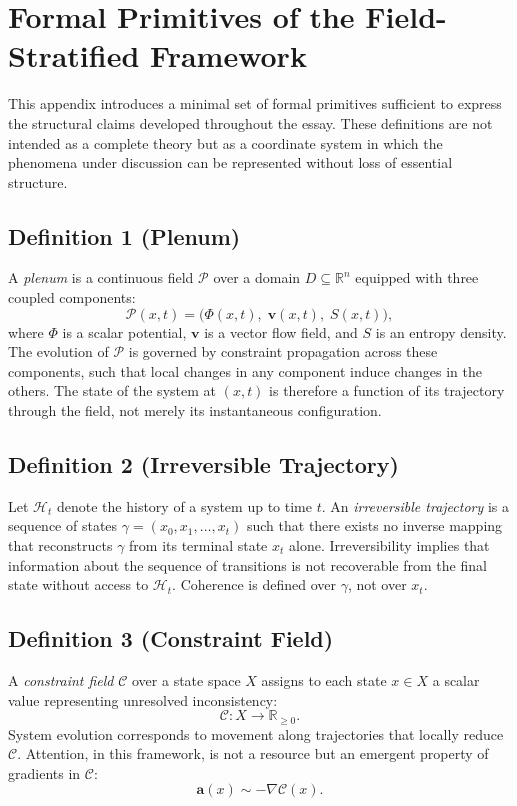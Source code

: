 \documentclass[12pt, a4paper]{article}
\begin{document}
\appendix

\section{Formal Primitives of the Field-Stratified Framework}

This appendix introduces a minimal set of formal primitives sufficient to express the structural claims developed throughout the essay. These definitions are not intended as a complete theory but as a coordinate system in which the phenomena under discussion can be represented without loss of essential structure.

\subsection*{Definition 1 (Plenum)}

A \emph{plenum} is a continuous field $\mathcal{P}$ over a domain $D \subseteq \mathbb{R}^n$ equipped with three coupled components:
\[
\mathcal{P}(x,t) = \bigl(\Phi(x,t),\; \mathbf{v}(x,t),\; S(x,t)\bigr),
\]
where $\Phi$ is a scalar potential, $\mathbf{v}$ is a vector flow field, and $S$ is an entropy density. The evolution of $\mathcal{P}$ is governed by constraint propagation across these components, such that local changes in any component induce changes in the others. The state of the system at $(x,t)$ is therefore a function of its trajectory through the field, not merely its instantaneous configuration.

\subsection*{Definition 2 (Irreversible Trajectory)}

Let $\mathcal{H}_t$ denote the history of a system up to time $t$. An \emph{irreversible trajectory} is a sequence of states $\gamma = (x_0, x_1, \ldots, x_t)$ such that there exists no inverse mapping that reconstructs $\gamma$ from its terminal state $x_t$ alone. Irreversibility implies that information about the sequence of transitions is not recoverable from the final state without access to $\mathcal{H}_t$. Coherence is defined over $\gamma$, not over $x_t$.

\subsection*{Definition 3 (Constraint Field)}

A \emph{constraint field} $\mathcal{C}$ over a state space $X$ assigns to each state $x \in X$ a scalar value representing unresolved inconsistency:
\[
\mathcal{C} \colon X \to \mathbb{R}_{\geq 0}.
\]
System evolution corresponds to movement along trajectories that locally reduce $\mathcal{C}$. Attention, in this framework, is not a resource but an emergent property of gradients in $\mathcal{C}$:
\[
\mathbf{a}(x) \sim -\nabla \mathcal{C}(x).
\]
\end{document}
